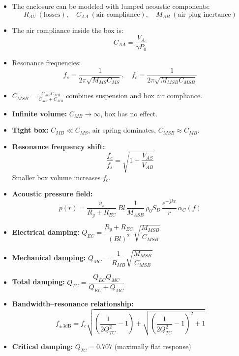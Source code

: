 \begin{tcolorbox}[colback=gray!10!white,colframe=black,title=\textbf{Summary – Acoustic Enclosure Model}]
\begin{itemize}
    \item The enclosure can be modeled with lumped acoustic components:
    \[
    R_{AU} \ (\text{losses}), \quad C_{AA} \ (\text{air compliance}), \quad M_{AB} \ (\text{air plug inertance})
    \]
    \item The air compliance inside the box is:
    \[
    C_{AA} = \frac{V_A}{\gamma P_0}
    \]
    \item Resonance frequencies:
    \[
    f_s = \frac{1}{2\pi \sqrt{M_{MS} C_{MS}}}, \quad f_c = \frac{1}{2\pi \sqrt{M_{MSB} C_{MSB}}}
    \]
    \item \( C_{MSB} = \frac{C_{MS} C_{MB}}{C_{MS} + C_{MB}} \) combines suspension and box air compliance.
\end{itemize}
\end{tcolorbox}



\begin{tcolorbox}[colback=gray!10!white,colframe=black,title=\textbf{Summary – Box Suspension and Acoustic Field}]
\begin{itemize}
    \item \textbf{Infinite volume:} \( C_{MB} \to \infty \), box has no effect.
    \item \textbf{Tight box:} \( C_{MB} \ll C_{MS} \), air spring dominates, \( C_{MSB} \approx C_{MB} \).
    \item \textbf{Resonance frequency shift:}
    \[
    \frac{f_c}{f_s} = \sqrt{1 + \frac{V_{AS}}{V_{AB}}}
    \]
    Smaller box volume increases \( f_c \).
    \item \textbf{Acoustic pressure field:}
    \[
    p(r) = \frac{v_s}{R_g + R_{EC}} \, B l \, \frac{1}{M_{ASB}} \, \rho_0 S_D \, \frac{e^{-jkr}}{r} \, \alpha_C(f)
    \]
\end{itemize}
\end{tcolorbox}



\begin{tcolorbox}[colback=gray!10!white,colframe=black,title=\textbf{Summary – Quality Factors and Bandwidth}]
\begin{itemize}
    \item \textbf{Electrical damping:} \( Q_{EC} = \dfrac{R_g + R_{EC}}{(B l)^2} \sqrt{\dfrac{M_{MSB}}{C_{MSB}}} \)
    \item \textbf{Mechanical damping:} \( Q_{MC} = \dfrac{1}{R_{MB}} \sqrt{\dfrac{M_{MSB}}{C_{MSB}}} \)
    \item \textbf{Total damping:} \( Q_{TC} = \dfrac{Q_{EC} Q_{MC}}{Q_{EC} + Q_{MC}} \)
    \item \textbf{Bandwidth–resonance relationship:}
    \[
    f_{\pm 3\text{dB}} = f_c \sqrt{\left( \frac{1}{2 Q_{TC}^2} - 1 \right) + \sqrt{\left( \frac{1}{2 Q_{TC}^2} - 1 \right)^2 + 1}}
    \]
    \item \textbf{Critical damping:} \( Q_{TC} = 0.707 \) (maximally flat response)
\end{itemize}
\end{tcolorbox}
